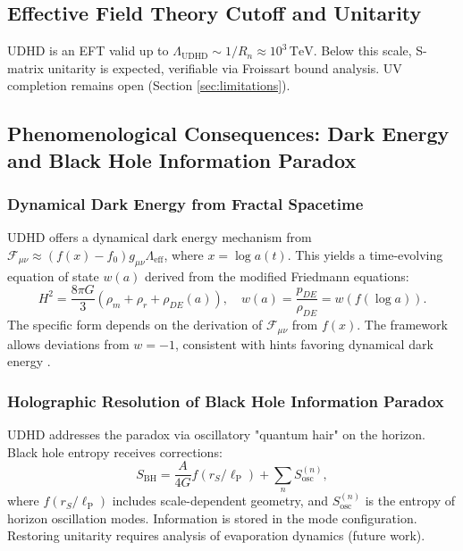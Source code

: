 \documentclass[12pt, a4paper]{article} %
\newcommand{\lplanck}{\ell_{\text{P}}}
\begin{document}
\subsection{Effective Field Theory Cutoff and Unitarity}
UDHD is an EFT valid up to \( \Lambda_{\text{UDHD}} \sim 1/R_n \approx 10^3 \, \text{TeV} \). Below this scale, S-matrix unitarity is expected, verifiable via Froissart bound analysis. UV completion remains open (Section \ref{sec:limitations}).

\subsection{Phenomenological Consequences: Dark Energy and Black Hole Information Paradox}
\subsubsection*{Dynamical Dark Energy from Fractal Spacetime}
UDHD offers a dynamical dark energy mechanism from \( \mathcal{F}_{\mu\nu} \approx (f(x) - f_0) g_{\mu\nu} \Lambda_{\text{eff}} \), where \(x=\log a(t)\). This yields a time-evolving equation of state \(w(a)\) derived from the modified Friedmann equations:
\begin{equation}
H^2 = \frac{8\pi G}{3} (\rho_m + \rho_r + \rho_{DE}(a)), \quad w(a) = \frac{p_{DE}}{\rho_{DE}} = w(f(\log a)).
\label{eq:dark_energy_w_sec3_final_ultra}
\end{equation}
The specific form depends on the derivation of \(\mathcal{F}_{\mu\nu}\) from \(f(x)\). The framework allows deviations from \(w=-1\), consistent with hints favoring dynamical dark energy \cite{desi2024bao, lsst2009science}.

\subsubsection*{Holographic Resolution of Black Hole Information Paradox}
UDHD addresses the paradox via oscillatory "quantum hair" on the horizon. Black hole entropy receives corrections:
\begin{equation}
S_{\text{BH}} = \frac{A}{4G} f(r_S/\lplanck) + \sum_{n} S_{\text{osc}}^{(n)},
\label{eq:bh_entropy_final_sec3_final_full_ultra}
\end{equation}
where \(f(r_S/\lplanck)\) includes scale-dependent geometry, and \( S_{\text{osc}}^{(n)} \) is the entropy of horizon oscillation modes. Information is stored in the mode configuration. Restoring unitarity requires analysis of evaporation dynamics (future work).
\end{document}
